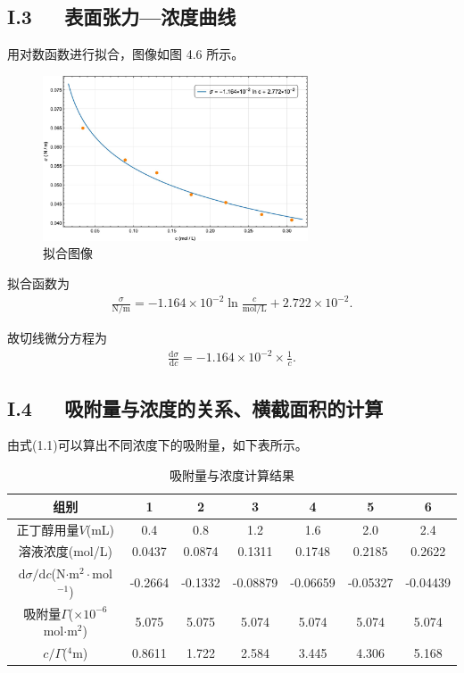 \documentclass[12pt]{ctexart}
\numberwithin{equation}{section}
\begin{document}
\pagebreak

\subsection*{I.3~~~表面张力—浓度曲线}

用对数函数进行拟合，图像如图 4.6 所示。

\begin{figure}[ht]
    \centering
    \includegraphics[width=0.7\textwidth]{fitting.jpeg}
    \caption{拟合图像}
\end{figure}

拟合函数为
\begin{align}
    \frac{\sigma}{\mathrm{N/m}} = -1.164\times 10^{-2}
    \ln \frac{c}{\mathrm{mol/L}} + 2.722\times 10^{-2}.
    \tag{I.3}
\end{align}

故切线微分方程为
\begin{align}
    \frac{\mathrm{d}\sigma}{\mathrm{d}c}
    = -1.164\times 10^{-2}\times \frac{1}{c}.
    \tag{I.4}
\end{align}

\subsection*{I.4~~~吸附量与浓度的关系、横截面积的计算}

由式(1.1)可以算出不同浓度下的吸附量，如下表所示。

\begin{longtable}{c|cccccc}
    \caption{吸附量与浓度计算结果} \\
    \hline
    组别 & 1 & 2 & 3 & 4 & 5 & 6\\
    \hline
    正丁醇用量$V$(mL) & 0.4 & 0.8 & 1.2 & 1.6 & 2.0 & 2.4  \\
    \hline
    溶液浓度(mol/L) & 0.0437 & 0.0874 & 0.1311 & 0.1748 & 0.2185 & 0.2622 \\
    \hline
    $\mathrm{d}\sigma/\mathrm{d}c$(N$\cdot$m$^2\cdot$mol$^{-1}$) &
    -0.2664 & -0.1332 & -0.08879 & -0.06659 & -0.05327 & -0.04439  \\
    \hline
    吸附量$\Gamma$($\times10^{-6}$mol$\cdot$m$^2$) &
    5.075 & 5.075 & 5.074 & 5.074 & 5.074 & 5.074  \\
    \hline
    $c/\Gamma$(\times 10$^4$m) &
    0.8611 & 1.722 & 2.584 & 3.445 & 4.306 & 5.168 \\
    \hline
\end{longtable}
\end{document}

